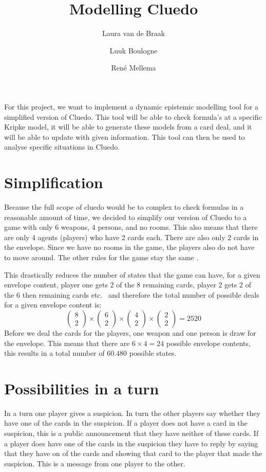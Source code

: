\documentclass[a4paper, 10pt]{article}
\title{Modelling Cluedo}
\author{Laura van de Braak \and Luuk Boulogne \and Ren\'e Mellema}
\date{}
\newcommand{\abov}[2]{\left(\begin{array}{c} #1 \\ #2 \end{array}\right)}
\begin{document}
\maketitle

For this project, we want to implement a dynamic epistemic modelling tool
for a simplified version of Cluedo. This tool will be able to check
formula's at a specific Kripke model, it will be able to generate these
models from a card deal, and it will be able to update with given
information. This tool can then be used to analyse specific situations in
Cluedo.

\section{Simplification}
Because the full scope of cluedo would be to complex to check formulas in a
reasonable amount of time, we decided to simplify our version of Cluedo to
a game with only 6 weapons, 4 persons, and no rooms. This also means that
there are only 4 agents (players) who have 2 cards each. There are also
only 2 cards in the envelope. Since we have no rooms in the game, the
players also do not have to move around. The other rules for the game stay
the same \citep{cluedo}.

This drastically reduces the number of states that the game can have, for a
given envelope content, player one gets 2 of the 8 remaining cards, player
2 gets 2 of the 6 then remaining cards etc.~ and therefore the total number
of possible deals for a given envelope content is:
\begin{equation}
    \abov{8}{2} \times \abov{6}{2} \times \abov{4}{2} \times \abov{2}{2} =
    2520
\end{equation}
Before we deal the cards for the players, one weapon and one person is draw
for the envelope. This means that there are $6 \times 4 = 24$ possible
envelope contents, this results in a total number of $60.480$ possible
states.

\section{Possibilities in a turn}
In a turn one player gives a suspicion. In turn the other players say
whether they have one of the cards in the suspicion. If a player does not
have a card in the suspicion, this is a public announcement that they have
neither of these cards. If a player does have one of the cards in the suspicion
they have to reply by saying that they have on of the cards and showing
that card to the player that made the suspicion. This is a message from one
player to the other.





\end{document}
